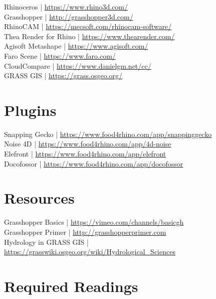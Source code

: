 \documentclass[11pt,article,oneside]{memoir}
\begin{document}
Rhinoceros | \url{https://www.rhino3d.com/}\\
Grasshopper | \url{http://grasshopper3d.com/}\\
RhinoCAM | \url{https://mecsoft.com/rhinocam-software/}\\
Thea Render for Rhino | \url{https://www.thearender.com/}\\
Agisoft Metashape | \url{https://www.agisoft.com/}\\
Faro Scene | \url{https://www.faro.com/}\\
CloudCompare | \url{https://www.danielgm.net/cc/}\\
GRASS GIS | \url{https://grass.osgeo.org/}\\

\section{Plugins}
Snapping Gecko | \url{https://www.food4rhino.com/app/snappinggecko}\\
Noise 4D | \url{https://www.food4rhino.com/app/4d-noise}\\
Elefront | \url{https://www.food4rhino.com/app/elefront}\\
Docofossor | \url{https://www.food4rhino.com/app/docofossor}\\

\section{Resources}

Grasshopper Basics | \url{https://vimeo.com/channels/basicgh}\\
Grasshopper Primer | \url{http://grasshopperprimer.com}\\
Hydrology in GRASS GIS | \url{https://grasswiki.osgeo.org/wiki/Hydrological_Sciences}\\

\section{Required Readings}
\vspace*{0.5cm}
\nocite{*}
\setlength{}
\printbibliography[keyword=required, heading=none]
\end{document}
